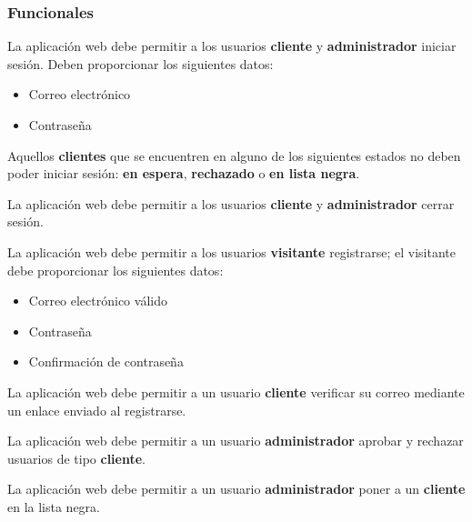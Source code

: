 %
%

\subsubsection{Funcionales}

{
  La aplicación web debe permitir a los usuarios \textbf{cliente} y
  \textbf{administrador} iniciar sesión. Deben proporcionar los siguientes
  datos:
  \begin{itemize}
    \item Correo electrónico
    \item Contraseña
  \end{itemize}

  \begin{hangparas}{2em}{0}
    {
      Aquellos \textbf{clientes} que se encuentren en alguno de los siguientes
      estados no deben poder iniciar sesión: \textbf{en espera},
      \textbf{rechazado} o \textbf{en lista negra}.
    }
  \end{hangparas}
}

{
  La aplicación web debe permitir a los usuarios \textbf{cliente} y
  \textbf{administrador} cerrar sesión.
}

{
  La aplicación web debe permitir a los usuarios \textbf{visitante}
  registrarse; el visitante debe proporcionar los siguientes datos:
  \begin{itemize}
    \item Correo electrónico válido
    \item Contraseña
    \item Confirmación de contraseña
  \end{itemize}
}

{
  La aplicación web debe permitir a un usuario \textbf{cliente} verificar
  su correo mediante un enlace enviado al registrarse.
}

{
  La aplicación web debe permitir a un usuario \textbf{administrador} aprobar
  y rechazar usuarios de tipo \textbf{cliente}.
}

{
  La aplicación web debe permitir a un usuario \textbf{administrador} poner a
  un \textbf{cliente} en la lista negra.
}


